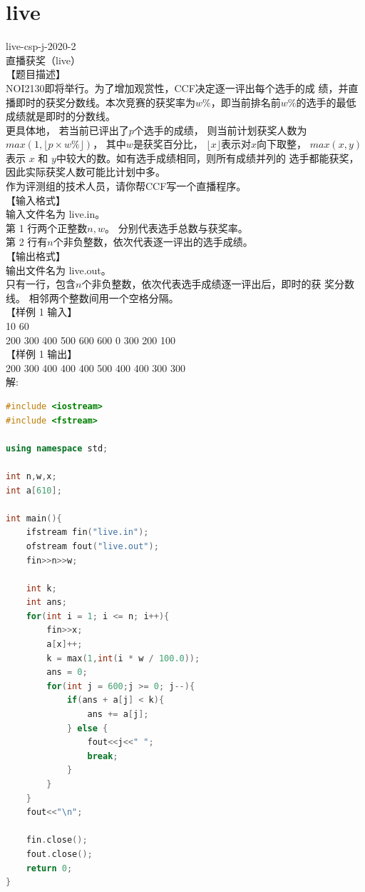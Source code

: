 \documentclass[12pt,twiside,a4paper]{ctexbook}
\numberwithin{chapter}{part}
\begin{document}
\section{live}
live-csp-j-2020-2\\
直播获奖（live）\\
【题目描述】\\
NOI2130即将举行。为了增加观赏性，CCF决定逐一评出每个选手的成
绩，并直播即时的获奖分数线。本次竞赛的获奖率为$w\%$，即当前排名前$w\%$的选手的最低成绩就是即时的分数线。\\
更具体地， 若当前已评出了$p$个选手的成绩， 则当前计划获奖人数为
$max(1,\lfloor p\times w\%\rfloor)$， 其中$w$是获奖百分比， $\lfloor x \rfloor$表示对$x$向下取整，
$max(x,y)$ 表示 $x$ 和 $y$中较大的数。如有选手成绩相同，则所有成绩并列的
选手都能获奖，因此实际获奖人数可能比计划中多。\\
作为评测组的技术人员，请你帮CCF写一个直播程序。\\
【输入格式】\\
输入文件名为 live.in。\\
第 1 行两个正整数$n,w$。 分别代表选手总数与获奖率。\\
第 2 行有$n$个非负整数，依次代表逐一评出的选手成绩。\\
【输出格式】\\
输出文件名为 live.out。\\
只有一行，包含$n$个非负整数，依次代表选手成绩逐一评出后，即时的获
奖分数线。 相邻两个整数间用一个空格分隔。\\
【样例 1 输入】\\
10 60\\
200 300 400 500 600 600 0 300 200 100\\
【样例 1 输出】\\
200 300 400 400 400 500 400 400 300 300\\
解:
\begin{lstlisting}[language=C++,breaklines = true]
#include <iostream>
#include <fstream>

using namespace std;

int n,w,x;
int a[610];

int main(){
	ifstream fin("live.in");
	ofstream fout("live.out");
	fin>>n>>w;

	int k;
	int ans;
	for(int i = 1; i <= n; i++){
		fin>>x;
		a[x]++;
		k = max(1,int(i * w / 100.0));
		ans = 0;
		for(int j = 600;j >= 0; j--){
			if(ans + a[j] < k){
				ans += a[j];
			} else {
				fout<<j<<" ";
				break;
			}
		}
	}
	fout<<"\n";

	fin.close();
	fout.close();
	return 0;
}
\end{lstlisting}
\end{document}
